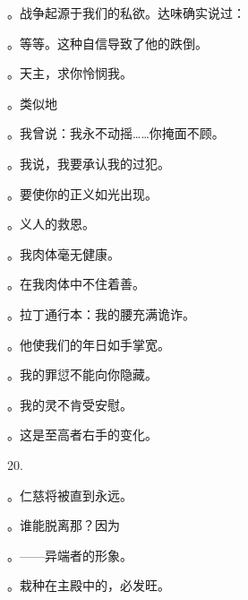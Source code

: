 。战争起源于我们的私欲。达味确实说过：\par

。等等。这种自信导致了他的跌倒。\par

。天主，求你怜悯我。\par

。类似地\par

。我曾说：我永不动摇……你掩面不顾。\par

。我说，我要承认我的过犯。\par

。要使你的正义如光出现。\par

。义人的救恩。\par

。我肉体毫无健康。\par

。在我肉体中不住着善。\par

。拉丁通行本：我的腰充满诡诈。\par

。他使我们的年日如手掌宽。\par

。我的罪愆不能向你隐藏。\par

。我的灵不肯受安慰。\par

。这是至高者右手的变化。\par

20.\par

。仁慈将被直到永远。\par

。谁能脱离那？因为\par

。——异端者的形象。\par

。栽种在主殿中的，必发旺。\par

